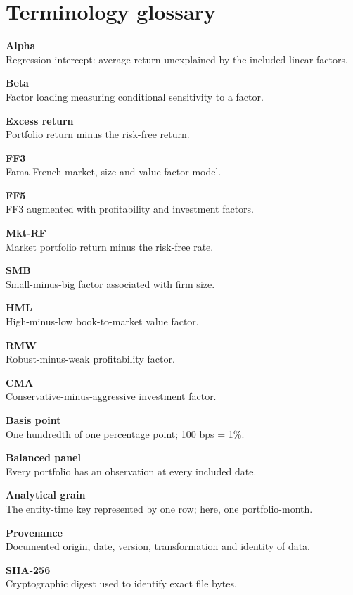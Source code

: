 \hypertarget{glossary}{}
\hypertarget{terminology-glossary}{%
\chapter{Terminology glossary}\label{terminology-glossary}}

\hypertarget{glossary-grid}{}
\textbf{Alpha}\\
Regression intercept: average return unexplained by the included linear
factors.

\textbf{Beta}\\
Factor loading measuring conditional sensitivity to a factor.

\textbf{Excess return}\\
Portfolio return minus the risk-free return.

\textbf{FF3}\\
Fama-French market, size and value factor model.

\textbf{FF5}\\
FF3 augmented with profitability and investment factors.

\textbf{Mkt-RF}\\
Market portfolio return minus the risk-free rate.

\textbf{SMB}\\
Small-minus-big factor associated with firm size.

\textbf{HML}\\
High-minus-low book-to-market value factor.

\textbf{RMW}\\
Robust-minus-weak profitability factor.

\textbf{CMA}\\
Conservative-minus-aggressive investment factor.

\textbf{Basis point}\\
One hundredth of one percentage point; 100 bps = 1\%.

\textbf{Balanced panel}\\
Every portfolio has an observation at every included date.

\textbf{Analytical grain}\\
The entity-time key represented by one row; here, one portfolio-month.

\textbf{Provenance}\\
Documented origin, date, version, transformation and identity of data.

\textbf{SHA-256}\\
Cryptographic digest used to identify exact file bytes.

